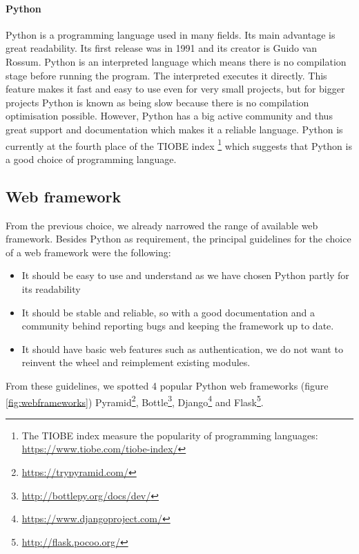 \paragraph{Python}
Python is a programming language used in many fields. Its main advantage is great readability. Its first release was in 1991 and its creator is Guido van Rossum. Python is an interpreted language which means there is no compilation stage before running the program. The interpreted executes it directly. This feature makes it fast and easy to use even for very small projects, but for bigger projects Python is known as being slow because there is no compilation optimisation possible.\cite{python-slow}
However, Python has a big active community and thus great support and documentation which makes it a reliable language. Python is currently at the fourth place of the TIOBE index \footnote{The TIOBE index measure the popularity of programming languages: \url{ https://www.tiobe.com/tiobe-index/}} which suggests that Python is a good choice of programming language. 

\subsection{Web framework}
From the previous choice, we already narrowed the range of available web framework.
Besides Python as requirement, the principal guidelines for the choice of a web framework were the following:
\begin{itemize}
\item It should be easy to use and understand as we have chosen Python partly for its readability
\item It should be stable and reliable, so with a good documentation and a community behind reporting bugs and keeping the framework up to date.
\item It should have basic web features such as authentication, we do not want to reinvent the wheel and reimplement existing modules. 
\end{itemize}
From these guidelines, we spotted 4 popular Python web frameworks (figure \ref{fig:webframeworks}) Pyramid\footnote{\url{https://trypyramid.com/}}, Bottle\footnote{\url{http://bottlepy.org/docs/dev/}}, Django\footnote{\url{https://www.djangoproject.com/}} and Flask\footnote{\url{http://flask.pocoo.org/}}.

